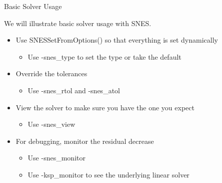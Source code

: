 \begin{frame}{Basic Solver Usage}

  We will illustrate basic solver usage with {\kb SNES}.
\begin{itemize}
  \item Use {\kb SNESSetFromOptions()} so that everything is set dynamically
  \begin{itemize}
    \item Use {\kb -snes\_type} to set the type or take the default
  \end{itemize}

  \item Override the tolerances
  \begin{itemize}
    \item Use {\kb -snes\_rtol} and {\kb -snes\_atol}
  \end{itemize}

  \item View the solver to make sure you have the one you expect
  \begin{itemize}
    \item Use {\kb -snes\_view}
  \end{itemize}

  \item For debugging, monitor the residual decrease
  \begin{itemize}
    \item Use {\kb -snes\_monitor}
    \item Use {\kb -ksp\_monitor} to see the underlying linear solver
  \end{itemize}
\end{itemize}

\end{frame}
